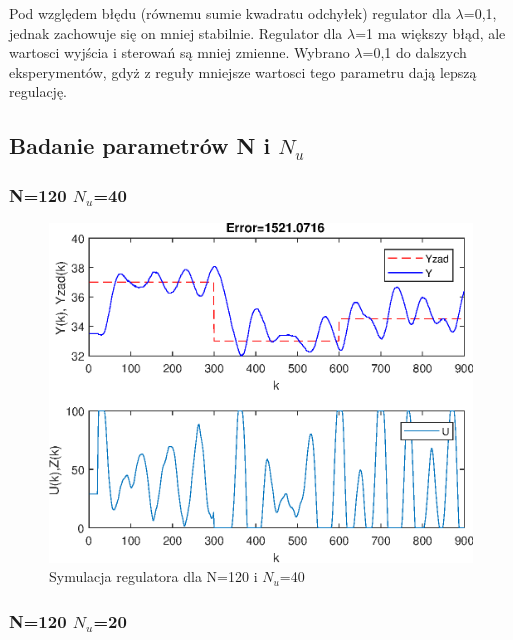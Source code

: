 \FloatBarrier

Pod względem błędu (równemu sumie kwadratu odchyłek) regulator dla $\lambda$=0,1, jednak zachowuje się on mniej stabilnie. Regulator dla $\lambda$=1 ma większy błąd, ale wartosci wyjścia i sterowań są mniej zmienne. Wybrano $\lambda$=0,1 do dalszych eksperymentów, gdyż z reguły mniejsze wartosci tego parametru dają lepszą regulację.

\subsection {Badanie parametrów N i $N_{u}$}

\subsubsection{ N=120 $N_{u}$=40}

\begin{figure}[h!]
	\centering
	\includegraphics[scale=1]{Rys/N=120Nu=40lambda=0.1.eps}
	\caption{Symulacja regulatora dla N=120 i $N_{u}$=40}
	\label{nnu1}
\end{figure}
\FloatBarrier
\subsubsection{ N=120 $N_{u}$=20}

